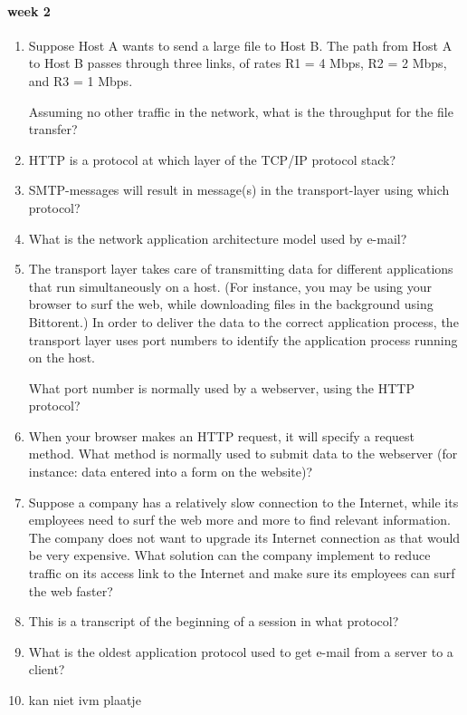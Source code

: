 \paragraph{week 2}
\begin{enumerate}
    \item Suppose Host A wants to send a large file to Host B. The path from Host A to Host B passes through three links, of rates R1 = 4 Mbps, R2 = 2 Mbps, and R3 = 1 Mbps.

    Assuming no other traffic in the network, what is the throughput for the file transfer?
    \item HTTP is a protocol at which layer of the TCP/IP protocol stack?
    \item SMTP-messages will result in message(s) in the transport-layer using which protocol?
    \item What is the network application architecture model used by e-mail?
    \item The transport layer takes care of transmitting data for different applications that run simultaneously on a host. (For instance, you may be using your browser to surf the web, while downloading files in the background using Bittorent.) In order to deliver the data to the correct application process, the transport layer uses port numbers to identify the application process running on the host.

    What port number is normally used by a webserver, using the HTTP protocol?
    \item When your browser makes an HTTP request, it will specify a request method. What method is normally used to submit data to the webserver  (for instance: data entered into a form on the website)?
    \item Suppose a company has a relatively slow connection to the Internet, while its employees need to surf the web more and more to find relevant information. The company does not want to upgrade its Internet connection as that would be very expensive. What solution can the company implement to reduce traffic on its access link to the Internet and make sure its employees can surf the web faster?
    \item This is a transcript of the beginning of a session in what protocol?
    \item What is the oldest application protocol used to get e-mail from a server to a client?
    \item kan niet ivm plaatje
\end{enumerate}
